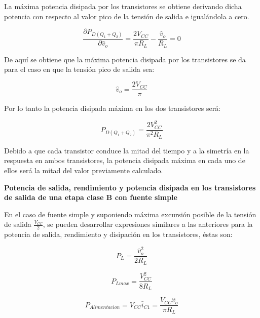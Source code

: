 La máxima potencia disipada por los transistores se obtiene
derivando dicha potencia con respecto al valor pico de la tensión de
salida e igualándola a cero.

\begin{equation}
	\frac{\displaystyle \partial P_{D(Q_1+Q_2)}}{\displaystyle \partial
		\hat{v}_{o}}=\frac{\displaystyle 2V_{CC}}{\displaystyle \pi
		R_L}-\frac{\displaystyle \hat{v}_{o}}{\displaystyle R_L}=0
\end{equation}


De aquí se obtiene que la máxima potencia disipada por los
transistores se da para el caso en que la tensión pico de salida
sea:

\begin{equation}
	\hat{v}_{o}=\frac{\displaystyle 2V_{CC}}{\displaystyle \pi}
\end{equation}


Por lo tanto la potencia disipada máxima en los dos transistores
será:

\begin{equation}
	P_{D(Q_1+Q_2)}=\frac{\displaystyle 2V_{CC}^2}{\displaystyle \pi^2 R_L }
\end{equation}


Debido a que cada transistor conduce la mitad del tiempo y a la
simetría en la respuesta en ambos transistores, la potencia disipada
máxima en cada uno de ellos será la mitad del valor previamente
calculado.

\medskip

\textbf{Potencia de salida, rendimiento y potencia disipada en los
	transistores de salida de una etapa clase B con fuente simple}

\bigskip

En el caso de fuente simple y suponiendo máxima excursión posible de
la tensión de salida $\frac{V_{CC}}{2}$, se pueden desarrollar
expresiones similares a las anteriores para la potencia de salida,
rendimiento y disipación en los transistores, éstas son:

\begin{equation}
	P_L=\frac{\displaystyle \hat{v}_o^2}{\displaystyle 2R_L}
\end{equation}

\begin{equation}
	P_{Lmax}=\frac{\displaystyle V_{CC}^2}{\displaystyle 8R_L}
\end{equation}

\begin{equation}
	P_{Alimentacion}=V_{CC}\bar{i}_{C1}=\frac{\displaystyle V_{CC}\hat{v}_o}{\displaystyle \pi R_L}
\end{equation}

